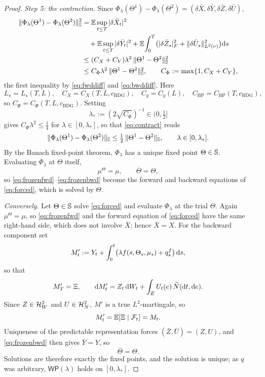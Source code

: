 \begin{proof}
\emph{Step 5: the contraction.} Since
$\Phi_\lambda(\Theta^1)-\Phi_\lambda(\Theta^2)
=(\delta\bar X,\delta\bar Y,\delta\bar Z,\delta\bar U)$,
\begin{equation}\label{eq:contract}
\begin{aligned}
\|\Phi_\lambda(\Theta^1)-\Phi_\lambda(\Theta^2)\|_{\mathbb{S}}^2
&=\mathbb{E}\sup_{t\le T}|\delta\bar X_t|^2\\
&\quad+\mathbb{E}\sup_{t\le T}|\delta\bar Y_t|^2
+\mathbb{E}\!\int_0^T\!\big(|\delta\bar Z_s|_F^2+\lVert \delta\bar U_s\rVert_{L^2(\nu)}^2\big)\mathrm{d} s\\
&\le(C_X+C_Y)\lambda^2\,\|\Theta^1-\Theta^2\|_{\mathbb{S}}^2\\
&\le C_\Phi\lambda^2\,\|\Theta^1-\Theta^2\|_{\mathbb{S}}^2 ,
\qquad C_\Phi:=\max\{1,C_X+C_Y\} ,
\end{aligned}
\end{equation}
the first inequality by \eqref{eq:fwddiff} and \eqref{eq:bwddiff}. Here
\[
L_\star=L_\star(T,L),\quad C_X=C_X(T,L,c_{\mathrm{BDG}}),\quad
C_g=C_g(L),\quad C_{\mathrm{BP}}=C_{\mathrm{BP}}(T,c_{\mathrm{BDG}}),
\]
so $C_\Phi=C_\Phi(T,L,c_{\mathrm{BDG}})$. Setting
\[
\lambda_*:=(2\sqrt{C_\Phi})^{-1}\in(0,\tfrac12]
\]
gives $C_\Phi\lambda^2\le\tfrac14$ for $\lambda\in[0,\lambda_*]$, so that \eqref{eq:contract}
reads
\[
\|\Phi_\lambda(\Theta^1)-\Phi_\lambda(\Theta^2)\|_{\mathbb{S}}
\le\tfrac12\,\|\Theta^1-\Theta^2\|_{\mathbb{S}},\qquad\lambda\in[0,\lambda_*] .
\]
By the Banach fixed-point theorem, $\Phi_\lambda$ has a unique fixed point $\Theta\in\mathbb{S}$.
Evaluating $\Phi_\lambda$ at $\Theta$ itself,
\[
\mu^\Theta=\mu,\qquad\bar\Theta=\Theta ,
\]
so \eqref{eq:frozenfwd}--\eqref{eq:frozenbwd} become the forward and backward equations of
\eqref{eq:forced}, which is solved by $\Theta$.

\emph{Conversely.} Let $\Theta\in\mathbb{S}$ solve \eqref{eq:forced} and evaluate $\Phi_\lambda$
at the trial $\Theta$. Again $\mu^\Theta=\mu$, so \eqref{eq:frozenfwd} and the forward
equation of \eqref{eq:forced} have the same right-hand side, which does not involve
$\bar X$; hence $\bar X=X$. For the backward component set
\[
M'_t:=Y_t+\int_0^t\!\big(\lambda f(s,\Theta_s,\mu_s)+q^f_s\big)\,\mathrm{d} s ,
\]
so that
\[
M'_T=\Xi,\qquad
\mathrm{d} M'_t=Z_t\,\mathrm{d} W_t+\int_E U_t(e)\,\widetilde{N}(\mathrm{d} t,\mathrm{d} e) .
\]
Since $Z\in\mathcal{H}^2_W$ and $U\in\mathcal{H}^2_N$, $M'$ is a true $L^2$-martingale, so
\[
M'_t=\mathbb{E}[\Xi\mid\mathcal{F}_t]=M_t .
\]
Uniqueness of the predictable representation forces $(\bar Z,\bar U)=(Z,U)$, and
\eqref{eq:frozenbwd} then gives $\bar Y=Y$, so
\[
\bar\Theta=\Theta .
\]
Solutions are therefore exactly the fixed points, and the solution is unique; as $q$ was
arbitrary, $\mathsf{WP}(\lambda)$ holds on $[0,\lambda_*]$.
\end{proof}

